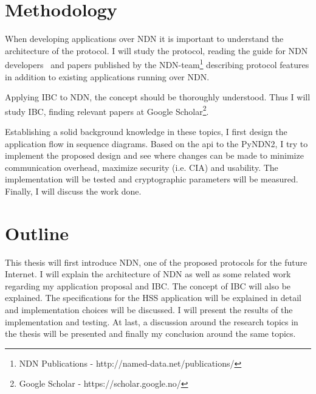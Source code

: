 \section{Methodology}

When developing applications over \gls{NDN} it is important to understand the architecture of the protocol. 
I will study the protocol, reading the guide for NDN developers~\cite{NDN-0021} and papers published by the \gls{NDN}-team\footnote{NDN Publications - http://named-data.net/publications/} describing protocol features in addition to existing applications running over \gls{NDN}.

Applying \gls{IBC} to \gls{NDN}, the concept should be thoroughly understood.
Thus I will study \gls{IBC}, finding relevant papers at Google Scholar\footnote{Google Scholar - https://scholar.google.no/}.

Establishing a solid background knowledge in these topics, I first design the application flow in sequence diagrams.
Based on the \gls{api} to the \gls{PyNDN2}, I try to implement the proposed design and see where changes can be made to minimize communication overhead, maximize security (i.e. \gls{CIA}) and usability.
The implementation will be tested and cryptographic parameters will be measured.
Finally, I will discuss the work done.

\section{Outline}

This thesis will first introduce \gls{NDN}, one of the proposed protocols for the future Internet.
I will explain the architecture of \gls{NDN} as well as some related work regarding my application proposal and \gls{IBC}. 
The concept of \gls{IBC} will also be explained.
The specifications for the \gls{HSS} application will be explained in detail and implementation choices will be discussed.
I will present the results of the implementation and testing.
At last, a discussion around the research topics in the thesis will be presented and finally my conclusion around the same topics.
